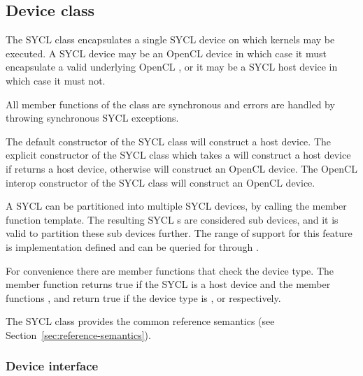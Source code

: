

\subsection{Device class}

The SYCL  class encapsulates a single SYCL device on which kernels may be executed. A SYCL device may be an OpenCL device in which case it must encapsulate a valid underlying OpenCL , or it may be a SYCL host device in which case it must not.

All member functions of the  class are synchronous and errors are handled by throwing synchronous SYCL exceptions.

The default constructor of the SYCL  class will construct a
host device. The explicit constructor of the SYCL  class
which takes a  will construct a host device if
 returns a host device, otherwise will construct an
OpenCL device. The OpenCL interop constructor of the SYCL 
class will construct an OpenCL device.

A SYCL  can be partitioned into multiple SYCL devices, by calling the  member function template. The resulting SYCL s are considered sub devices, and it is valid to partition these sub devices further. The range of support for this feature is implementation defined and can be queried for through .

For convenience there are member functions that check the device type. The member function  returns true if the SYCL  is a host device and the member functions ,  and  return true if the device type is ,  or  respectively.

The SYCL  class provides the common reference semantics
(see Section~\ref{sec:reference-semantics}).

\subsubsection{Device interface}

